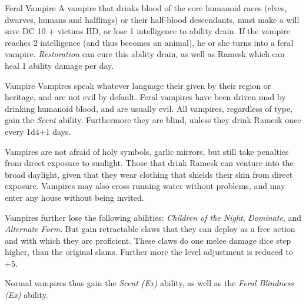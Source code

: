 \begin{35e}{Feral Vampire}
  A vampire that drinks blood of the core humanoid races (elves, dwarves,
  humans and halflings) or their half-blood descendants, must make a will save
  DC 10 + victims HD, or lose 1 intelligence to ability drain. If the vampire
  reaches 2 intelligence (and thus becomes an animal), he or she turns into a
  feral vampire. \emph{Restoration} can cure this ability drain, as well as
  Ramesk which can heal 1 ability damage per day.
\end{35e}

\begin{35e}{Vampire}
  Vampires speak whatever language their given by their region or heritage,
  and are not evil by default. Feral vampires have been driven mad by drinking
  humanoid blood, and are usually evil. All vampires, regardless of type, gain
  the \emph{Scent} ability. Furthermore they are blind, unless they drink
  Ramesk once every 1d4+1 days.

  Vampires are not afraid of holy symbols, garlic mirrors, but still take
  penalties from direct exposure to sunlight. Those that drink Ramesk can
  venture into the broad daylight, given that they wear clothing that shields
  their skin from direct exposure. Vampires may also cross running water
  without problems, and may enter any house without being invited.

  Vampires further lose the following abilities: \emph{Children of the Night},
  \emph{Dominate}, and \emph{Alternate Form}. But gain retractable claws that
  they can deploy as a free action and with which they are proficient. These
  claws do one melee damage dice step higher, than the original slams. Further
  more the level adjustment is reduced to +5.

  Normal vampires thus gain the \emph{Scent (Ex)} ability, as well as the
  \emph{Feral Blindness (Ex)} ability.


\end{35e}
